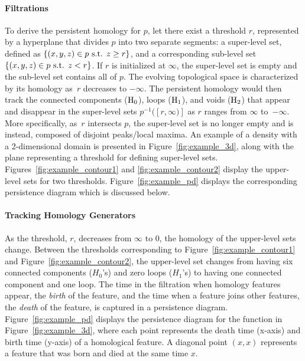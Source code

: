 \documentclass[12pt]{article}
\begin{document}
\paragraph{Filtrations}
To derive the persistent homology for $p$, let there exist a threshold $r$, represented by a hyperplane that divides $p$ into two separate segments: a super-level set, defined as $\{(x,y,z) \in p \textup{ s.t. } z \geq r \}$, and a corresponding sub-level set $\{(x,y,z) \in p \textup{ s.t. } z < r \}$. If $r$ is initialized at $\infty$, the super-level set is empty and the sub-level set contains all of $p$. The evolving topological space is characterized by its homology as~$r$ decreases to $-\infty$. The persistent homology would then track the connected
components ($\textup{H}_{0}$), loops ($\textup{H}_{1}$), and voids ($\textup{H}_{2}$) that appear and disappear in the super-level sets $p^{-1}([r,\infty)]$ as $r$ ranges from $\infty$ to~$-\infty$. More specifically, as~$r$ intersects $p$, the super-level set is no longer empty and is instead, composed of disjoint peaks/local maxima.  An example of a density with a 2-dimensional domain is presented in Figure~\ref{fig:example_3d}, along with the plane representing a threshold for defining super-level sets.  Figures~\ref{fig:example_contour1} and \ref{fig:example_contour2} display the upper-level sets for two thresholds.  Figure~\ref{fig:example_pd} displays the corresponding persistence diagram which is discussed below.


\paragraph{Tracking Homology Generators}
As the threshold, $r$, decreases from $\infty$ to $0$, the homology of the upper-level sets change.  Between the thresholds corresponding to  Figure~\ref{fig:example_contour1} and Figure~\ref{fig:example_contour2}, the upper-level set
changes from having six connected components ($H_0$'s) and zero loops ($H_1$'s) to having one connected component and one loop.  The time in the filtration when homology features appear, the \emph{birth} of the feature, and the time when a feature joins other features, the \emph{death} of the feature, is captured in a persistence diagram.
Figure~\ref{fig:example_pd} displays the persistence diagram for the function in Figure~\ref{fig:example_3d}, where each point represents the death time (x-axis) and birth time (y-axis) of a homological feature. A
diagonal point $(x,x)$ represents a feature that was born and died at the same time $x$.  
\end{document}
